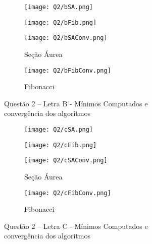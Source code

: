 \documentclass[fleqn, 11pt]{article}
\begin{document}
\begin{figure}[H]
\centering
\begin{subfigure}{.5\textwidth}
  \centering
  \texttt{[image: Q2/bSA.png]}
\end{subfigure}%
\begin{subfigure}{.5\textwidth}
  \centering
  \texttt{[image: Q2/bFib.png]}
\end{subfigure}

\centering
\begin{subfigure}{.5\textwidth}
  \centering
  \texttt{[image: Q2/bSAConv.png]}
  \caption{Seção Áurea}
\end{subfigure}%
\begin{subfigure}{.5\textwidth}
  \centering
  \texttt{[image: Q2/bFibConv.png]}
  \caption{Fibonacci}
\end{subfigure}
\caption{Questão 2 -- Letra B - Mínimos Computados e \\ convergência dos algoritmos}
\label{Q2B}
\end{figure}

\begin{figure}[H]
\centering
\begin{subfigure}{.5\textwidth}
  \centering
  \texttt{[image: Q2/cSA.png]}
\end{subfigure}%
\begin{subfigure}{.5\textwidth}
  \centering
  \texttt{[image: Q2/cFib.png]}
\end{subfigure}

\centering
\begin{subfigure}{.5\textwidth}
  \centering
  \texttt{[image: Q2/cSAConv.png]}
  \caption{Seção Áurea}
\end{subfigure}%
\begin{subfigure}{.5\textwidth}
  \centering
  \texttt{[image: Q2/cFibConv.png]}
  \caption{Fibonacci}
\end{subfigure}
\caption{Questão 2 -- Letra C - Mínimos Computados e \\ convergência dos algoritmos}
\end{figure}
\end{document}
